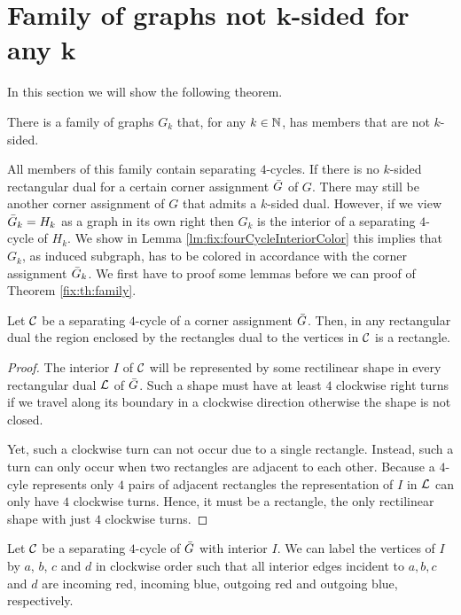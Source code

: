 
\section{Family of graphs not $\mathbf{k}$-sided for any $\mathbf{k}$}
\thispagestyle{plain}
  \label{s:fix}
  In this section we will show the following theorem.

  \begin{thrm}
    \label{fix:th:family}
      There is a family of graphs $G_k$ that, for any $k \in \mathbb{N}$, has members that are not $k$-sided.
  \end{thrm}

  All members of this family contain separating $4$-cycles.
  If there is no $k$-sided rectangular dual for a certain corner assignment $\bar{G}$ of $G$. There may still be another corner assignment of $G$ that admits a $k$-sided dual.
  However, if we view $\bar{G}_k = H_k$ as a graph in its own right then $G_k$ is the interior of a separating $4$-cycle of $H_k$. We show in Lemma \ref{lm:fix:fourCycleInteriorColor} this implies that $G_k$, as induced subgraph, has to be colored in accordance with the corner assignment $\bar{G}_k$. We first have to proof some lemmas before we can proof of Theorem \ref{fix:th:family}.

  \begin{lemma}
    \label{lm:interiorRectangle}
    Let $\mathcal{C}$ be a separating $4$-cycle of a corner assignment $\bar{G}$. Then, in any rectangular dual the region enclosed by the rectangles dual to the vertices in $\mathcal{C}$ is a rectangle.
  \end{lemma}
  \begin{proof}
    The interior $I$ of $\mathcal{C}$ will be represented by some rectilinear shape in every rectangular dual $\mathcal{L}$ of $\bar{G}$. Such a shape must have at least $4$ clockwise right turns if we travel along its boundary in a clockwise direction otherwise the shape is not closed.

    Yet, such a clockwise turn can not occur due to a single rectangle. Instead, such a turn can only occur when two rectangles are adjacent to each other. Because a $4$-cyle represents only $4$ pairs of adjacent rectangles the representation of $I$ in $\mathcal{L}$ can only have $4$ clockwise turns. Hence, it must be a rectangle, the only rectilinear shape with just $4$ clockwise turns.
  \end{proof}

  \begin{lemma}
  \label{lm:fix:fourCycleInteriorColor}
  Let $\mathcal{C}$ be a separating $4$-cycle of $\bar{G}$ with interior $I$. We can label the vertices of $I$ by $a$, $b$, $c$ and $d$ in clockwise order such that all interior edges incident to $a, b, c$ and $d$ are incoming red, incoming blue, outgoing red and outgoing blue, respectively.
  \end{lemma}

